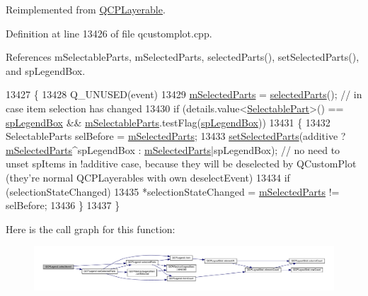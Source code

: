 Reimplemented from \hyperlink{class_q_c_p_layerable_a7498c2d0d081cf7cad0fb3bb93aa0e91}{Q\+C\+P\+Layerable}.



Definition at line 13426 of file qcustomplot.\+cpp.



References m\+Selectable\+Parts, m\+Selected\+Parts, selected\+Parts(), set\+Selected\+Parts(), and sp\+Legend\+Box.


\begin{DoxyCode}
13427 \{
13428   Q\_UNUSED(event)
13429   \hyperlink{class_q_c_p_legend_a917a34dd2856baafd8d56852d94d00e2}{mSelectedParts} = \hyperlink{class_q_c_p_legend_abbbf1b2d6a149013527ed87b0780894a}{selectedParts}(); \textcolor{comment}{// in case item selection has changed}
13430   if (details.value<\hyperlink{class_q_c_p_legend_a5404de8bc1e4a994ca4ae69e2c7072f1}{SelectablePart}>() == \hyperlink{class_q_c_p_legend_a5404de8bc1e4a994ca4ae69e2c7072f1a0fa4758962a46fa1dc9da818abae23c4}{spLegendBox} && 
      \hyperlink{class_q_c_p_legend_a179b4d5c1bea723b76e402ff48f0d7fb}{mSelectableParts}.testFlag(\hyperlink{class_q_c_p_legend_a5404de8bc1e4a994ca4ae69e2c7072f1a0fa4758962a46fa1dc9da818abae23c4}{spLegendBox}))
13431   \{
13432     SelectableParts selBefore = \hyperlink{class_q_c_p_legend_a917a34dd2856baafd8d56852d94d00e2}{mSelectedParts};
13433     \hyperlink{class_q_c_p_legend_a2aee309bb5c2a794b1987f3fc97f8ad8}{setSelectedParts}(additive ? \hyperlink{class_q_c_p_legend_a917a34dd2856baafd8d56852d94d00e2}{mSelectedParts}^spLegendBox : 
      \hyperlink{class_q_c_p_legend_a917a34dd2856baafd8d56852d94d00e2}{mSelectedParts}|spLegendBox); \textcolor{comment}{// no need to unset spItems in !additive case, because they will
       be deselected by QCustomPlot (they're normal QCPLayerables with own deselectEvent)}
13434     \textcolor{keywordflow}{if} (selectionStateChanged)
13435       *selectionStateChanged = \hyperlink{class_q_c_p_legend_a917a34dd2856baafd8d56852d94d00e2}{mSelectedParts} != selBefore;
13436   \}
13437 \}
\end{DoxyCode}


Here is the call graph for this function\+:\nopagebreak
\begin{figure}[H]
\begin{center}
\leavevmode
\includegraphics[width=350pt]{class_q_c_p_legend_af93bf87dc5c383a9d2ada80b35f3a1a5_cgraph}
\end{center}
\end{figure}


